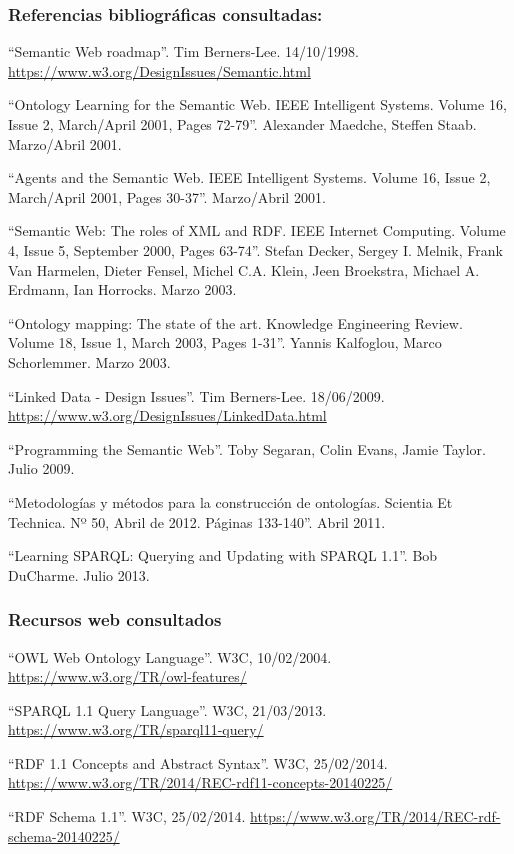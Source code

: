 
\subsubsection*{Referencias bibliográficas consultadas:}

 ``Semantic Web roadmap''. Tim Berners-Lee. 14/10/1998. \url{https://www.w3.org/DesignIssues/Semantic.html}

 ``Ontology Learning for the Semantic Web. IEEE Intelligent Systems. Volume 16, Issue 2, March/April 2001, Pages 72-79''. Alexander Maedche, Steffen Staab. Marzo/Abril 2001.

 ``Agents and the Semantic Web. IEEE Intelligent Systems. Volume 16, Issue 2, March/April 2001, Pages 30-37''. Marzo/Abril 2001.

 ``Semantic Web: The roles of XML and RDF. IEEE Internet Computing. Volume 4, Issue 5, September 2000, Pages 63-74''. Stefan Decker, Sergey I. Melnik, Frank Van Harmelen, Dieter Fensel, Michel C.A. Klein, Jeen Broekstra, Michael A. Erdmann, Ian Horrocks. Marzo 2003.

 ``Ontology mapping: The state of the art. Knowledge Engineering Review. Volume 18, Issue 1, March 2003, Pages 1-31''. Yannis Kalfoglou, Marco Schorlemmer. Marzo 2003.

 ``Linked Data - Design Issues''. Tim Berners-Lee. 18/06/2009. \url{https://www.w3.org/DesignIssues/LinkedData.html}

 ``Programming the Semantic Web''. Toby Segaran, Colin Evans, Jamie Taylor. Julio 2009.

 ``Metodologías y métodos para la construcción de ontologías. Scientia Et Technica. Nº 50, Abril de 2012. Páginas 133-140''. Abril 2011.

 ``Learning SPARQL: Querying and Updating with SPARQL 1.1''. Bob DuCharme. Julio 2013.

\bigskip
\subsubsection*{Recursos web consultados}

 ``OWL Web Ontology Language''. W3C, 10/02/2004. \url{https://www.w3.org/TR/owl-features/}

 ``SPARQL 1.1 Query Language''. W3C, 21/03/2013. \url{https://www.w3.org/TR/sparql11-query/}

 ``RDF 1.1 Concepts and Abstract Syntax''. W3C, 25/02/2014. \url{https://www.w3.org/TR/2014/REC-rdf11-concepts-20140225/}

 ``RDF Schema 1.1''. W3C, 25/02/2014. \url{https://www.w3.org/TR/2014/REC-rdf-schema-20140225/}